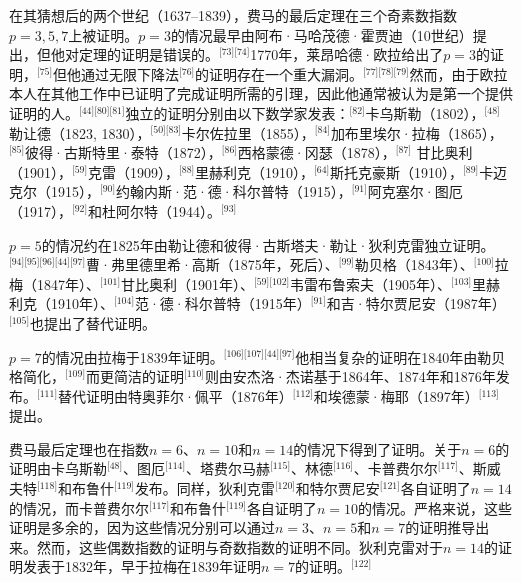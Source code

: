 在其猜想后的两个世纪（1637–1839），费马的最后定理在三个奇素数指数\( p = 3, 5, 7 \)上被证明。\( p = 3 \)的情况最早由阿布·马哈茂德·霍贾迪（10世纪）提出，但他对定理的证明是错误的。\(^\text{[73][74]}\)1770年，莱昂哈德·欧拉给出了\( p = 3 \)的证明，\(^\text{[75]}\)但他通过无限下降法\(^\text{[76]}\)的证明存在一个重大漏洞。\(^\text{[77][78][79]}\)然而，由于欧拉本人在其他工作中已证明了完成证明所需的引理，因此他通常被认为是第一个提供证明的人。\(^\text{[44][80][81]}\)独立的证明分别由以下数学家发表：\(^\text{[82]}\)卡乌斯勒（1802），\(^\text{[48]}\)勒让德（1823, 1830），\(^\text{[50][83]}\)卡尔佐拉里（1855），\(^\text{[84]}\)加布里埃尔·拉梅（1865），\(^\text{[85]}\)彼得·古斯特里·泰特（1872），\(^\text{[86]}\)西格蒙德·冈瑟（1878），\(^\text{[87]}\) 甘比奥利（1901），\(^\text{[59]}\)克雷（1909），\(^\text{[88]}\)里赫利克（1910），\(^\text{[64]}\)斯托克豪斯（1910），\(^\text{[89]}\)卡迈克尔（1915），\(^\text{[90]}\)约翰内斯·范·德·科尔普特（1915），\(^\text{[91]}\)阿克塞尔·图厄（1917），\(^\text{[92]}\)和杜阿尔特（1944）。\(^\text{[93]}\)

\( p = 5 \)的情况约在1825年由勒让德和彼得·古斯塔夫·勒让·狄利克雷独立证明。\(^\text{[94][95][96][44][97]}\)曹·弗里德里希·高斯（1875年，死后）、\(^\text{[99]}\)勒贝格（1843年）、\(^\text{[100]}\)拉梅（1847年）、\(^\text{[101]}\)甘比奥利（1901年）、\(^\text{[59][102]}\)韦雷布鲁索夫（1905年）、\(^\text{[103]}\)里赫利克（1910年）、\(^\text{[104]}\)范·德·科尔普特（1915年）\(^\text{[91]}\)和吉·特尔贾尼安（1987年）\(^\text{[105]}\)也提出了替代证明。

\( p = 7 \)的情况由拉梅于1839年证明。\(^\text{[106][107][44][97]}\)他相当复杂的证明在1840年由勒贝格简化，\(^\text{[109]}\)而更简洁的证明\(^\text{[110]}\)则由安杰洛·杰诺基于1864年、1874年和1876年发布。\(^\text{[111]}\)替代证明由特奥菲尔·佩平（1876年）\(^\text{[112]}\)和埃德蒙·梅耶（1897年）\(^\text{[113]}\)提出。

费马最后定理也在指数\( n = 6 \)、\( n = 10 \)和\( n = 14 \)的情况下得到了证明。关于\( n = 6 \)的证明由卡乌斯勒\(^\text{[48]}\)、图厄\(^\text{[114]}\)、塔费尔马赫\(^\text{[115]}\)、林德\(^\text{[116]}\)、卡普费尔尔\(^\text{[117]}\)、斯威夫特\(^\text{[118]}\)和布鲁什\(^\text{[119]}\)发布。同样，狄利克雷\(^\text{[120]}\)和特尔贾尼安\(^\text{[121]}\)各自证明了\( n = 14 \)的情况，而卡普费尔尔\(^\text{[117]}\)和布鲁什\(^\text{[119]}\)各自证明了\( n = 10 \)的情况。严格来说，这些证明是多余的，因为这些情况分别可以通过\( n = 3 \)、\( n = 5 \)和\( n = 7 \)的证明推导出来。然而，这些偶数指数的证明与奇数指数的证明不同。狄利克雷对于\( n = 14 \)的证明发表于1832年，早于拉梅在1839年证明\( n = 7 \)的证明。\(^\text{[122]}\)


